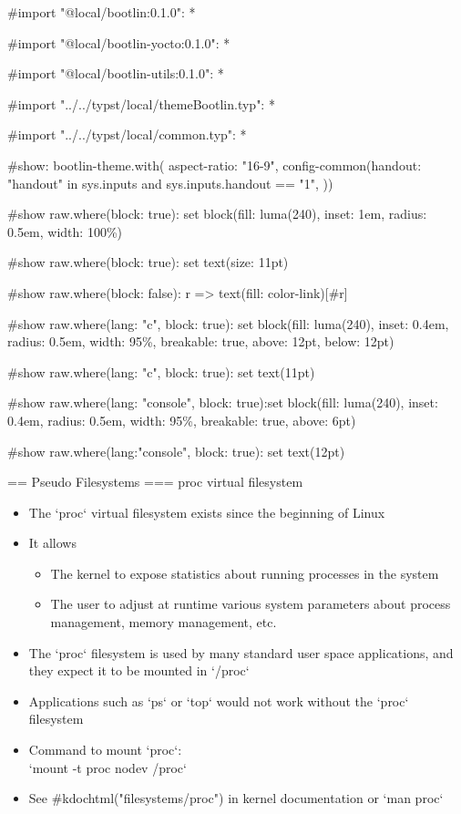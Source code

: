 #import "@local/bootlin:0.1.0": *

#import "@local/bootlin-yocto:0.1.0": *

#import "@local/bootlin-utils:0.1.0": *

#import "../../typst/local/themeBootlin.typ": *

#import "../../typst/local/common.typ": *

#show: bootlin-theme.with( aspect-ratio: "16-9", config-common(handout: "handout" in sys.inputs and sys.inputs.handout == "1", ))

#show raw.where(block: true): set block(fill: luma(240), inset: 1em, radius: 0.5em, width: 100\%)

#show raw.where(block: true): set text(size: 11pt)

#show raw.where(block: false): r => text(fill: color-link)[#r]

#show raw.where(lang: "c", block: true): set block(fill: luma(240), inset: 0.4em, radius: 0.5em, width: 95\%, breakable: true, above: 12pt, below: 12pt)

#show raw.where(lang: "c", block: true): set text(11pt)

#show raw.where(lang: "console", block: true):set block(fill: luma(240), inset: 0.4em, radius: 0.5em, width: 95\%, breakable: true, above: 6pt)

#show raw.where(lang:"console", block: true): set text(12pt)

 == Pseudo Filesystems
=== proc virtual filesystem
  \begin{itemize}
  \item The `proc` virtual filesystem exists since the beginning of
    Linux
  \item It allows
    \begin{itemize}
    \item The kernel to expose statistics about running processes in
      the system
    \item The user to adjust at runtime various system parameters
      about process management, memory management, etc.
    \end{itemize}
  \item The `proc` filesystem is used by many standard user space
    applications, and they expect it to be mounted in `/proc`
  \item Applications such as `ps` or `top` would not work
    without the `proc` filesystem
  \item Command to mount `proc`:\\
    `mount -t proc nodev /proc`
  \item See #kdochtml("filesystems/proc") in kernel documentation
        or `man proc`
  \end{itemize}


